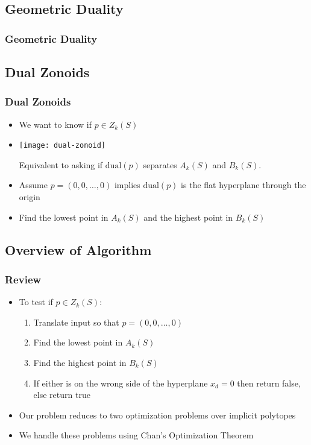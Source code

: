 \documentclass{beamer}
\begin{document}
\subsection{Geometric Duality}
\frame
{ \frametitle{Geometric Duality}
}

\subsection{Dual Zonoids}
\frame
{
   \frametitle{Dual Zonoids}
   \begin{itemize}
     \item<1-> We want to know if $p\in Z_k(S)$
     \item<2->
      \begin{center}
	\texttt{[image: dual-zonoid]}
      \end{center}
     Equivalent to asking if $\mathrm{dual}(p)$ separates $A_k(S)$ and $B_k(S)$.
     \item<3-> Assume $p=(0,0,\ldots,0)$ implies $\mathrm{dual}(p)$ is the flat
		hyperplane through the origin
     \item<4-> Find the lowest point in $A_k(S)$ and the highest point
in $B_k(S)$ 
   \end{itemize}
}

\subsection{Overview of Algorithm}
\frame
{
     \frametitle{Review}
     \begin{itemize}
     \item<1-> To test if $p\in Z_k(S)$:
     \begin{enumerate}
      \item<2-> Translate input so that $p=(0,0,\ldots,0)$
      \item<3-> Find the lowest point in $A_k(S)$
      \item<4-> Find the highest point in $B_k(S)$
      \item<5-> If either is on the wrong side of the hyperplane
	$x_d=0$ then return false, else return true
     \end{enumerate}
     \item<6->{Our problem reduces to two optimization problems over
	implicit polytopes \\}
     \item<7->{We handle these problems using Chan's Optimization Theorem}
    \end{itemize} 
}
\end{document}
